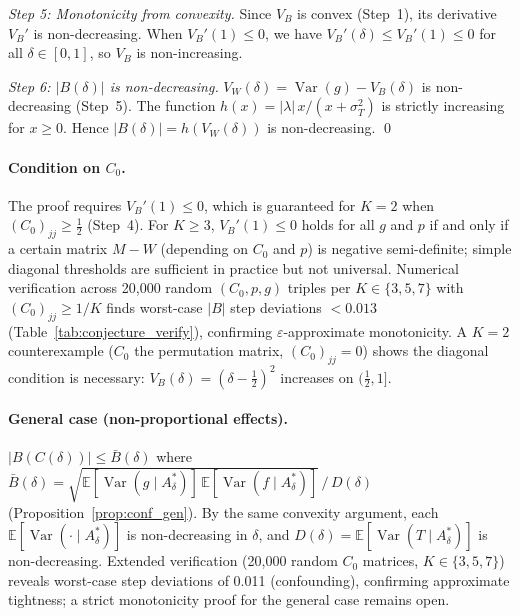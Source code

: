 \emph{Step 5: Monotonicity from convexity.}
Since $V_B$ is convex (Step~1), its derivative $V_B'$ is non-decreasing.
When $V_B'(1)\leq 0$, we have $V_B'(\delta)\leq V_B'(1)\leq 0$ for all $\delta\in[0,1]$, so $V_B$ is non-increasing.

\emph{Step 6: $|B(\delta)|$ is non-decreasing.}
$V_W(\delta)=\operatorname{Var}(g)-V_B(\delta)$ is non-decreasing (Step~5).
The function $h(x)=|\lambda|\,x/(x+\sigma_T^2)$ is strictly increasing for $x\geq 0$.
Hence $|B(\delta)|=h(V_W(\delta))$ is non-decreasing. \qed

\paragraph{Condition on $C_0$.}
The proof requires $V_B'(1)\leq 0$, which is guaranteed for $K{=}2$ when $(C_0)_{jj}\geq\tfrac{1}{2}$ (Step~4).
For $K\geq 3$, $V_B'(1)\leq 0$ holds for all $g$ and $p$ if and only if a certain matrix $M-W$ (depending on $C_0$ and $p$) is negative semi-definite; simple diagonal thresholds are sufficient in practice but not universal.
Numerical verification across 20{,}000 random $(C_0,p,g)$ triples per $K\in\{3,5,7\}$ with $(C_0)_{jj}\geq 1/K$ finds worst-case $|B|$ step deviations $< 0.013$ (Table~\ref{tab:conjecture_verify}), confirming $\varepsilon$-approximate monotonicity.
A $K{=}2$ counterexample ($C_0$ the permutation matrix, $(C_0)_{jj}{=}0$) shows the diagonal condition is necessary: $V_B(\delta)=(\delta{-}\tfrac{1}{2})^2$ increases on $(\tfrac{1}{2},1]$.

\paragraph{General case (non-proportional effects).}
$|B(C(\delta))|\leq\bar{B}(\delta)$ where $\bar{B}(\delta)=\sqrt{\mathbb{E}[\operatorname{Var}(g\mid A^*_\delta)]\,\mathbb{E}[\operatorname{Var}(f\mid A^*_\delta)]}\,/\,D(\delta)$ (Proposition~\ref{prop:conf_gen}).
By the same convexity argument, each $\mathbb{E}[\operatorname{Var}(\cdot\mid A^*_\delta)]$ is non-decreasing in $\delta$, and $D(\delta)=\mathbb{E}[\operatorname{Var}(T\mid A^*_\delta)]$ is non-decreasing.
Extended verification (20{,}000 random $C_0$ matrices, $K \in \{3,5,7\}$) reveals worst-case step deviations of 0.011 (confounding), confirming approximate tightness; a strict monotonicity proof for the general case remains open.

